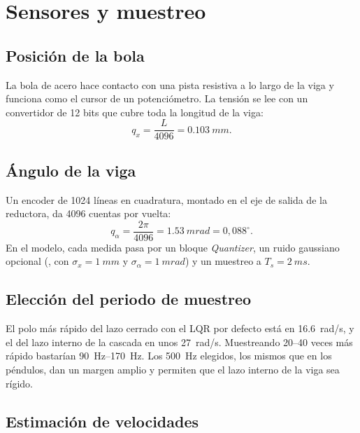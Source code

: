 \chapter{Sensores y muestreo}
\label{cap:sensores}

\section{Posición de la bola}

La bola de acero hace contacto con una pista resistiva a lo largo de la viga y funciona como el cursor de un potenciómetro. La tensión se lee con un convertidor de 12 bits que cubre toda la longitud de la viga:
\begin{equation}
  q_x = \frac{L}{4096} = \SI{0.103}{mm}.
\end{equation}

\section{Ángulo de la viga}

Un encoder de 1024 líneas en cuadratura, montado en el eje de salida de la reductora, da 4096 cuentas por vuelta:
\begin{equation}
  q_\alpha = \frac{2\pi}{4096} = \SI{1.53}{mrad} = 0{,}088^\circ .
\end{equation}
En el modelo, cada medida pasa por un bloque \emph{Quantizer}, un ruido gaussiano opcional (, con $\sigma_x=\SI{1}{mm}$ y $\sigma_\alpha=\SI{1}{mrad}$) y un muestreo a $T_s=\SI{2}{ms}$.

\section{Elección del periodo de muestreo}

El polo más rápido del lazo cerrado con el LQR por defecto está en \SI{16.6}{rad/s}, y el del lazo interno de la cascada en unos \SI{27}{rad/s}. Muestreando 20--40 veces más rápido bastarían \SIrange{90}{170}{Hz}. Los \SI{500}{Hz} elegidos, los mismos que en los péndulos, dan un margen amplio y permiten que el lazo interno de la viga sea rígido.

\section{Estimación de velocidades}

